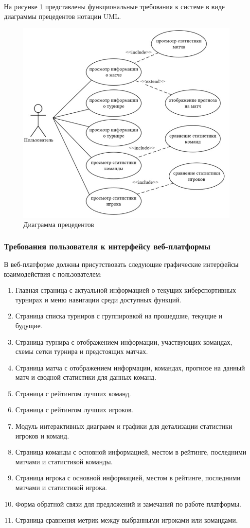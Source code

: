 На рисунке \ref{fig:-use_case_diagram} представлены функциональные требования к системе в виде диаграммы прецедентов нотации UML.
\begin{figure}
	\centering
	\includegraphics[width=0.7\linewidth]{"images/Диаграмма прецедентов"}
	\caption{Диаграмма прецедентов}
	\label{fig:-use_case_diagram}
\end{figure}



\subsubsection{Требования пользователя к интерфейсу веб-платформы}

В веб-платформе должны присутствовать следующие графические интерфейсы взаимодействия с пользователем:

\begin{enumerate}
	\item Главная страница с актуальной информацией о текущих киберспортивных турнирах и меню навигации среди доступных функций.
	\item Страница списка турниров с группировкой на прошедшие, текущие и будущие.
	\item Страница турнира с отображением информации, участвующих командах, схемы сетки турнира и предстоящих матчах.
	\item Страница матча с отображением информации, командах, прогнозе на данный матч и сводной статистики для данных команд.
	\item Страница с рейтингом лучших команд.
	\item Страница с рейтингом лучших игроков.
	\item Модуль интерактивных диаграмм и графики для детализации статистики игроков и команд.
	\item Страница команды с основной информацией, местом в рейтинге, последними матчами и статистикой команды.
	\item Страница игрока с основной информацией, местом в рейтинге, последними матчами и статистикой игрока.
	\item Форма обратной связи для предложений и замечаний по работе платформы.
	\item Страница сравнения метрик между выбранными игроками или командами.
\end{enumerate}

